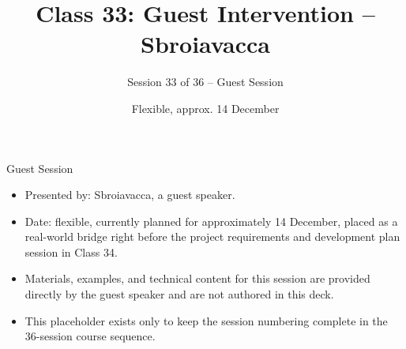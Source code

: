 

\title{Class 33: Guest Intervention -- Sbroiavacca}
\subtitle{Session 33 of 36 -- Guest Session}
\author{\coursename}
\date{Flexible, approx. 14 December}



\frame{\titlepage \coursefooter}

\begin{frame}{Guest Session}
\begin{itemize}
\item Presented by: Sbroiavacca, a guest speaker.
\item Date: flexible, currently planned for approximately 14 December, placed as a real-world bridge right before the project requirements and development plan session in Class 34.
\item Materials, examples, and technical content for this session are provided directly by the guest speaker and are not authored in this deck.
\item This placeholder exists only to keep the session numbering complete in the 36-session course sequence.
\end{itemize}
\coursefooter
\end{frame}


